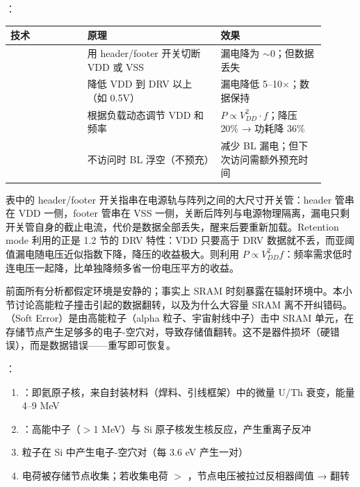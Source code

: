 ：

\begin{longtable}{L{0.22\linewidth}L{0.38\linewidth}L{0.30\linewidth}}
\toprule
技术 & 原理 & 效果 \\
\midrule
{} & 用 header/footer 开关切断 VDD 或 VSS & 漏电降为 $\sim$0；但数据丢失 \\\tablerowrule
{} & 降低 VDD 到 DRV 以上（如 0.5V） & 漏电降低 5--10$\times$；数据保持 \\\tablerowrule
{} & 根据负载动态调节 VDD 和频率 & $P \propto V_{DD}^2 \cdot f$；降压 20\% → 功耗降 36\% \\\tablerowrule
{} & 不访问时 BL 浮空（不预充） & 减少 BL 漏电；但下次访问需额外预充时间 \\
\bottomrule
\end{longtable}

表中的 header/footer 开关指串在电源轨与阵列之间的大尺寸开关管：header 管串在 VDD 一侧，footer 管串在 VSS 一侧，关断后阵列与电源物理隔离，漏电只剩开关管自身的截止电流，代价是数据全部丢失，醒来后要重新加载。Retention mode 利用的正是 1.2 节的 DRV 特性：VDD 只要高于 DRV 数据就不丢，而亚阈值漏电随电压近似指数下降，降压的收益极大。则利用 $P\propto V_{DD}^2 f$：频率需求低时连电压一起降，比单独降频多省一份电压平方的收益。


前面所有分析都假定环境是安静的；事实上 SRAM 时刻暴露在辐射环境中。本小节讨论高能粒子撞击引起的数据翻转，以及为什么大容量 SRAM 离不开纠错码。（Soft Error）是由高能粒子（alpha 粒子、宇宙射线中子）击中 SRAM 单元，在存储节点产生足够多的电子-空穴对，导致存储值翻转。这不是器件损坏（硬错误），而是数据错误——重写即可恢复。

：
\begin{enumerate}
  \item {}：即氦原子核，来自封装材料（焊料、引线框架）中的微量 U/Th 衰变，能量 4--9 MeV
  \item {}：高能中子（$>$1 MeV）与 Si 原子核发生核反应，产生重离子反冲
  \item 粒子在 Si 中产生电子-空穴对（每 3.6 eV 产生一对）
  \item 电荷被存储节点收集；若收集电荷 $>$ ，节点电压被拉过反相器阈值 → 翻转
\end{enumerate}

